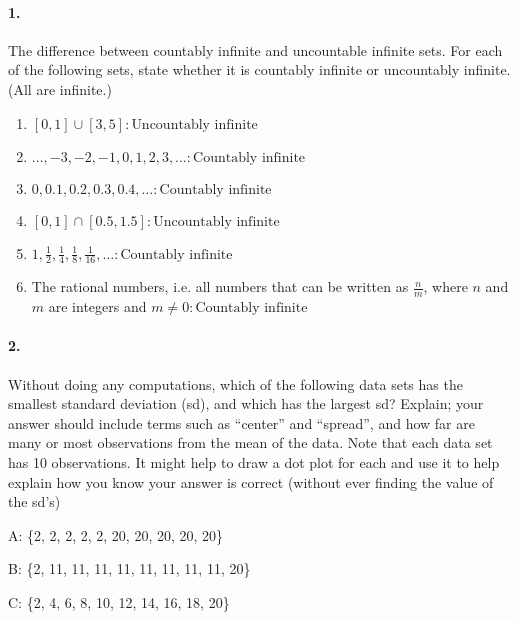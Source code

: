 

\renewcommand\assignment{Worksheet 2, due Monday January 23, 4:15pm}


    
    \paragraph*{1.}
    The difference between countably infinite and uncountable infinite sets. For each of the following sets, state whether it is countably infinite or uncountably infinite. (All are infinite.) 

    \begin{enumerate}[label=(\alph*)]
        \item $[0, 1] \cup [3, 5]: \boxed{\text{Uncountably infinite}}$
        \item $\dots,-3, -2, -1, 0, 1, 2, 3,\dots: \boxed{\text{Countably infinite}}$
        \item $0, 0.1, 0.2, 0.3, 0.4, \dots: \boxed{\text{Countably infinite}}$
        \item $[0, 1] \cap [0.5, 1.5]: \boxed{\text{Uncountably infinite}}$
        \item $1, \frac{1}{2}, \frac{1}{4}, \frac{1}{8}, \frac{1}{16}, \dots: \boxed{\text{Countably infinite}}$
        \item The rational numbers, i.e. all numbers that can be written as $\frac{n}{m}$, where $n$ and $m$ are integers and $m \neq 0: \boxed{\text{Countably infinite}}$
    \end{enumerate}

    \paragraph*{2.}
    Without doing any computations, which of the following data sets has the smallest standard deviation (sd), and which has the largest sd? Explain; your answer should include terms such as “center” and “spread”, and how far are many or most observations from the mean of the data. Note that each data set has 10 observations. It might help to draw a dot plot for each and use it to help explain how you know your answer is correct (without ever finding the value of the sd's)

    \begin{center}
        A: \{2, 2, 2, 2, 2, 20, 20, 20, 20, 20\}

        B: \{2, 11, 11, 11, 11, 11, 11, 11, 11, 20\}

        C: \{2, 4, 6, 8, 10, 12, 14, 16, 18, 20\}
    \end{center}


